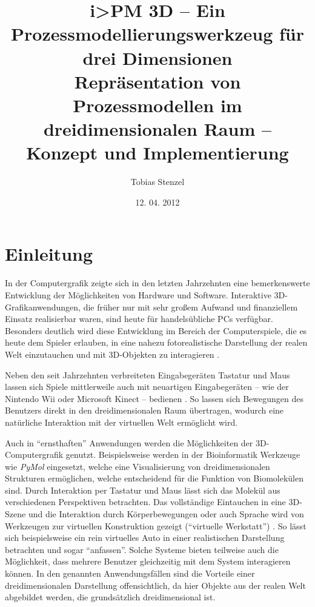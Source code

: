 \documentclass[a4paper,10pt]{sphinxmanual}
\title{
i>PM 3D -- Ein Prozessmodellierungswerkzeug für drei Dimensionen \\
\vspace{1cm}
Repräsentation von Prozessmodellen im dreidimensionalen Raum -- Konzept und Implementierung
}
\date{12. 04. 2012}
\author{Tobias Stenzel}
\begin{document}
\maketitle
\tableofcontents
{}\label{index-latex::doc}

\listoffigures
\pagebreak
{}

\chapter{Einleitung}
\label{einleitung:einleitung}\label{einleitung::doc}
In der Computergrafik zeigte sich in den letzten Jahrzehnten eine bemerkenswerte Entwicklung der Möglichkeiten von Hardware und Software.
Interaktive 3D-Grafikanwendungen, die früher nur mit sehr großem Aufwand und finanziellem Einsatz realisierbar waren, sind heute für handelsübliche PCs verfügbar.
Besonders deutlich wird diese Entwicklung im Bereich der Computerspiele, die es heute dem Spieler erlauben, in eine nahezu fotorealistische Darstellung der realen Welt einzutauchen und mit 3D-Objekten zu interagieren \cite{porcino_gaming_2004}.

Neben den seit Jahrzehnten verbreiteten Eingabegeräten Tastatur und Maus lassen sich Spiele mittlerweile auch mit neuartigen Eingabegeräten – wie der Nintendo Wii oder Microsoft Kinect – bedienen \cite{sung_recent_2011}.
So lassen sich Bewegungen des Benutzers direkt in den dreidimensionalen Raum übertragen, wodurch eine natürliche Interaktion mit der virtuellen Welt ermöglicht wird.

Auch in "`ernsthaften"' Anwendungen werden die Möglichkeiten der 3D-Computergrafik genutzt.
Beispielsweise werden in der Bioinformatik Werkzeuge wie \emph{PyMol} \cite{schrodinger_pymol_2010} eingesetzt, welche eine Visualisierung von dreidimensionalen Strukturen ermöglichen, welche entscheidend für die Funktion von Biomolekülen sind.
Durch Interaktion per Tastatur und Maus lässt sich das Molekül aus verschiedenen Perspektiven betrachten.
Das vollständige Eintauchen in eine 3D-Szene und die Interaktion durch Körperbewegungen oder auch Sprache wird von Werkzeugen zur virtuellen Konstruktion gezeigt ("`virtuelle Werkstatt"') \cite{frohlich_virtuelle_2009}.
So lässt sich beispielsweise ein rein virtuelles Auto in einer realistischen Darstellung betrachten und sogar "`anfassen"'.
Solche Systeme bieten teilweise auch die Möglichkeit, dass mehrere Benutzer gleichzeitig mit dem System interagieren können.
In den genannten Anwendungsfällen sind die Vorteile einer dreidimensionalen Darstellung offensichtlich, da hier Objekte aus der realen Welt abgebildet werden, die grundsätzlich dreidimensional ist.
\end{document}
